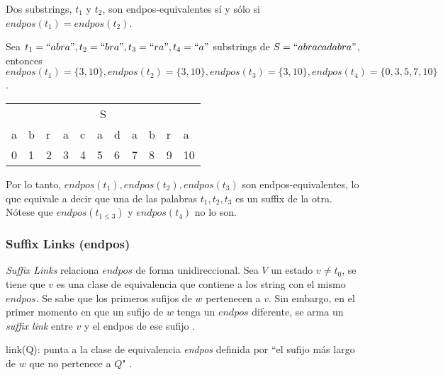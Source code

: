 Dos \glspl{substring}, $t_1$ y $t_2$, son endpos-equivalentes sí y sólo si $endpos(t_1) = endpos(t_2)$. 

\begin{example}
	Sea $t_1=``abra", t_2=``bra", t_3=``ra", t_4=``a"$ \glspl{substring} de $S = ``abracadabra"$, entonces $endpos(t_1) = \{3, 10\}, endpos(t_2) = \{3, 10\}, endpos(t_3) = \{3, 10\}, endpos(t_4) = \{0, 3, 5, 7, 10\}$.
	\begin{center}
		\begin{tabular}{lllllllllll}
			\multicolumn{11}{c}{S}                     \\
			a & b & r & a & c & a & d & a & b & r & a  \\
			0 & 1 & 2 & 3 & 4 & 5 & 6 & 7 & 8 & 9 & 10
		\end{tabular}
	\end{center}
	
	Por lo tanto, $endpos(t_1), endpos(t_2), endpos(t_3)$ son endpos-equivalentes, lo que equivale a decir que una de las palabras $t_1, t_2, t_3 $ es un \gls{suffix} de la otra. Nótese que $endpos(t_{1\leq3})$ y $endpos(t_4)$ no lo son.
\end{example}

\subsubsection{Suffix Links (endpos)}
\textit{Suffix Links} relaciona $endpos$ de forma unidireccional. Sea $V$ un estado $v \neq t_0$, se tiene que $v$ es una clase de equivalencia que contiene a los \gls{string} con el mismo $endpos$. Se sabe que los primeros sufijos de $w$ pertenecen a $v$. Sin embargo, en el primer momento en que un sufijo de $w$ tenga un $endpos$ diferente, se arma un \textit{suffix link} entre $v$ y el endpos de ese sufijo \cite{youtube:Automatas_de_Sufijos}.

\begin{definition}
	link(Q): punta a la clase de equivalencia \textit{endpos} definida por ``el sufijo más largo de $w$ que no pertenece a $Q$" \cite{web:suffix-automata}.
\end{definition}

